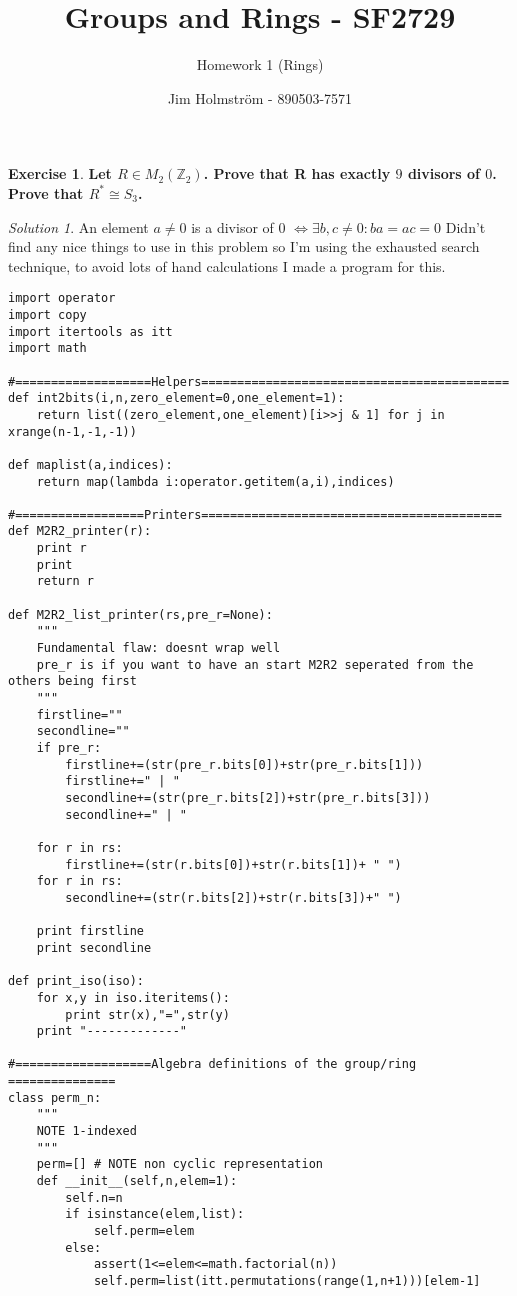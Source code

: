 \documentclass[a4paper,twoside=false,abstract=false,numbers=noenddot,
titlepage=false,headings=small,parskip=half,version=last]{scrartcl}
\author{Jim Holmström - 890503-7571}
\title{Groups and Rings - SF2729}
\subtitle{Homework 1 (Rings)}
\theoremstyle{definition}
\newtheorem{exercise}{Exercise}
\theoremstyle{remark}
\newtheorem*{solution}{Solution}
\newcommand{\ZZ}{\ensuremath{\mathbb{Z}}}
\begin{document}
\date{}

\maketitle
\thispagestyle{empty}

\begin{exercise}
{\bf
Let $R \in M_2(\ZZ_2)$. Prove that R has exactly $9$ divisors of $0$. Prove
that $R^* \cong S_3$.
}
\end{exercise}
\begin{solution}
An element $a \neq 0$ is a divisor of 0 $\Leftrightarrow \exists b,c \neq 0 : ba=ac=0$
Didn't find any nice things to use in this problem so I'm using the exhausted
search technique, to avoid lots of hand calculations I made a program for this.\\

\begin{verbatim}
import operator
import copy
import itertools as itt
import math

#===================Helpers===========================================
def int2bits(i,n,zero_element=0,one_element=1):
    return list((zero_element,one_element)[i>>j & 1] for j in xrange(n-1,-1,-1))

def maplist(a,indices):
    return map(lambda i:operator.getitem(a,i),indices)

#==================Printers==========================================
def M2R2_printer(r):
    print r
    print 
    return r

def M2R2_list_printer(rs,pre_r=None):
    """
    Fundamental flaw: doesnt wrap well
    pre_r is if you want to have an start M2R2 seperated from the others being first
    """
    firstline=""
    secondline=""
    if pre_r:
        firstline+=(str(pre_r.bits[0])+str(pre_r.bits[1]))
        firstline+=" | "
        secondline+=(str(pre_r.bits[2])+str(pre_r.bits[3]))
        secondline+=" | "

    for r in rs:
        firstline+=(str(r.bits[0])+str(r.bits[1])+ " ")
    for r in rs:
        secondline+=(str(r.bits[2])+str(r.bits[3])+" ")

    print firstline
    print secondline

def print_iso(iso):
    for x,y in iso.iteritems():
        print str(x),"=",str(y)
    print "-------------"

#===================Algebra definitions of the group/ring ===============
class perm_n:
    """
    NOTE 1-indexed
    """
    perm=[] # NOTE non cyclic representation
    def __init__(self,n,elem=1):
        self.n=n
        if isinstance(elem,list):
            self.perm=elem
        else:
            assert(1<=elem<=math.factorial(n))
            self.perm=list(itt.permutations(range(1,n+1)))[elem-1]


\end{verbatim}
\end{solution}
\end{document}
